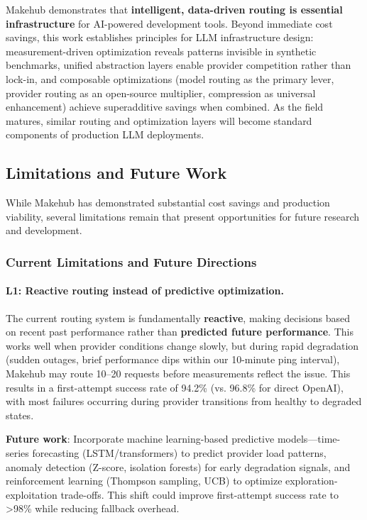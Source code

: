 \documentclass[english]{article}
\begin{document}
Makehub demonstrates that \textbf{intelligent, data-driven routing is essential infrastructure} for AI-powered development tools. Beyond immediate cost savings, this work establishes principles for LLM infrastructure design: measurement-driven optimization reveals patterns invisible in synthetic benchmarks, unified abstraction layers enable provider competition rather than lock-in, and composable optimizations (model routing as the primary lever, provider routing as an open-source multiplier, compression as universal enhancement) achieve superadditive savings when combined. As the field matures, similar routing and optimization layers will become standard components of production LLM deployments.

\subsection{Limitations and Future Work}

While Makehub has demonstrated substantial cost savings and production viability, several limitations remain that present opportunities for future research and development.

\subsubsection{Current Limitations and Future Directions}

\paragraph{L1: Reactive routing instead of predictive optimization.}

The current routing system is fundamentally \textbf{reactive}, making decisions based on recent past performance rather than \textbf{predicted future performance}. This works well when provider conditions change slowly, but during rapid degradation (sudden outages, brief performance dips within our 10-minute ping interval), Makehub may route 10--20 requests before measurements reflect the issue. This results in a first-attempt success rate of 94.2\% (vs. 96.8\% for direct OpenAI), with most failures occurring during provider transitions from healthy to degraded states.

\textbf{Future work}: Incorporate machine learning-based predictive models—time-series forecasting (LSTM/transformers) to predict provider load patterns, anomaly detection (Z-score, isolation forests) for early degradation signals, and reinforcement learning (Thompson sampling, UCB) to optimize exploration-exploitation trade-offs. This shift could improve first-attempt success rate to >98\% while reducing fallback overhead.
\end{document}
